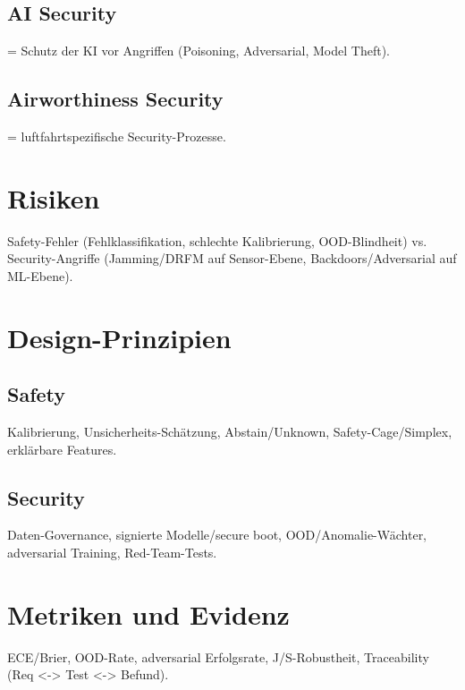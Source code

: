 \subsection{AI Security}
= Schutz der KI vor Angriffen (Poisoning, Adversarial, Model Theft).

\subsection{Airworthiness Security}
= luftfahrtspezifische Security-Prozesse.




\section{Risiken}
Safety-Fehler (Fehlklassifikation, schlechte Kalibrierung, OOD-Blindheit) 
vs. Security-Angriffe (Jamming/DRFM auf Sensor-Ebene, Backdoors/Adversarial auf ML-Ebene).

\section{Design-Prinzipien}
\subsection{Safety}
Kalibrierung, Unsicherheits-Schätzung, Abstain/Unknown, Safety-Cage/Simplex, erklärbare Features.

\subsection{Security}
Daten-Governance, signierte Modelle/secure boot, OOD/Anomalie-Wächter, adversarial Training, Red-Team-Tests.

\section{Metriken und Evidenz}
ECE/Brier, OOD-Rate, adversarial Erfolgsrate, J/S-Robustheit, Traceability (Req <-> Test <-> Befund).











